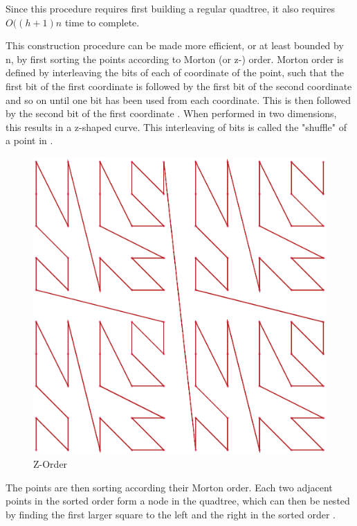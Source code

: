 \documentclass[mcs]{scsthesis}
\begin{document}
Since this procedure requires first building a regular quadtree, it also
requires \(O((h + 1)n\) time to complete.

This construction procedure can be made more efficient, or at least bounded by
n, by first sorting the points according to Morton (or z-) order. Morton order
is defined by interleaving the bits of each of coordinate of the point, such
that the first bit of the first coordinate is followed by the first bit of the
second coordinate and so on until one bit has been used from each coordinate.
This is then followed by the second bit of the first coordinate \cite{morton}.
When performed in two dimensions, this results in a z-shaped curve. This
interleaving of bits is called the "shuffle" of a point in \cite{bern}.

\begin{figure}
\begin{center}
\includegraphics[scale=0.4]{diagrams/zorder.eps}
\caption{Z-Order}
\end{center}
\end{figure}

The points are then sorting according their Morton order. Each two adjacent
points in the sorted order form a node in the quadtree, which can then be
nested by finding the first larger square to the left and the right in the
sorted order \cite{bern}.
\end{document}
